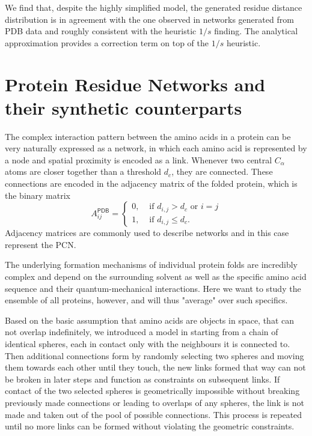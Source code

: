 \documentclass[
reprint,
twocolumn,
amsmath,amssymb,superscriptaddress,aps,
pre]{revtex4-1}
\begin{document}
We find that, despite the highly simplified model, the generated residue distance distribution is in agreement with the one observed in networks generated from PDB data and roughly consistent with the heuristic $1/s$ finding. The analytical approximation provides a correction term on top of the $1/s$ heuristic.


\section*{Protein Residue Networks and their synthetic counterparts}
The complex interaction pattern between the amino acids in a protein can be very naturally expressed as a network, in which each amino acid is represented by a node and spatial proximity is encoded as a link. Whenever two central $C_\alpha$ atoms are closer together than a threshold $d_c$, they are connected. These connections are encoded in the adjacency matrix of the folded protein, which is the binary matrix
\begin{equation}
  A^{\textsf{PDB}}_{ij}=
  \begin{cases}
   0, & \text{ if } d_{i,j}>d_c \text{ or } i=j\\
      1, & \text{ if } d_{i,j}\leq d_c .
      \end{cases}
    \label{eq:aij}
\end{equation}
Adjacency matrices are commonly used to describe networks and in this case represent the PCN.

The underlying formation mechanisms of individual protein folds are incredibly complex and depend on the surrounding solvent as well as the specific amino acid sequence and their quantum-mechanical interactions. Here we want to study the ensemble of all proteins, however, and will thus "average" over such specifics.

Based on the basic assumption that amino acids are objects in space, that can not overlap indefinitely, we introduced a model in \cite{molkenthin2020self} starting from a chain of identical spheres, each in contact only with the neighbours it is connected to. Then additional connections form by randomly selecting two spheres and moving them towards each other until they touch, the new links formed that way can not be broken in later steps and function as constraints on subsequent links. If contact of the two selected spheres is geometrically impossible without breaking previously made connections or leading to overlaps of any spheres, the link is not made and taken out of the pool of possible connections. This process is repeated until no more links can be formed without violating the geometric constraints.
\end{document}
